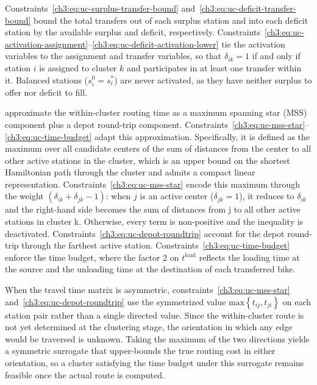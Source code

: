 Constraints~\eqref{ch3:eq:uc-surplus-transfer-bound} and~\eqref{ch3:eq:uc-deficit-transfer-bound} bound the total transfers out of each surplus station and into each deficit station by the available surplus and deficit, respectively. Constraints~\eqref{ch3:eq:uc-activation-assignment}--\eqref{ch3:eq:uc-deficit-activation-lower} tie the activation variables to the assignment and transfer variables, so that ${{\delta }_{ik}}=1$ if and only if station $i$ is assigned to cluster $k$ and participates in at least one transfer within it. Balanced stations ($s_{i}^{0}=s_{i}^{*}$) are never activated, as they have neither surplus to offer nor deficit to fill.

\citet{schuijbroekInventoryRebalancingVehicle2017} approximate the within-cluster routing time as a maximum spanning star (MSS) component plus a depot round-trip component. Constraints~\eqref{ch3:eq:uc-mss-star}--\eqref{ch3:eq:uc-time-budget} adapt this approximation. Specifically, it is defined as the maximum over all candidate centers of the sum of distances from the center to all other active stations in the cluster, which is an upper bound on the shortest Hamiltonian path through the cluster and admits a compact linear representation. Constraints~\eqref{ch3:eq:uc-mss-star} encode this maximum through the weight $\left( {{\delta }_{ik}}+{{\delta }_{jk}}-1 \right)$: when $j$ is an active center (${{\delta }_{jk}}=1$), it reduces to ${{\delta }_{ik}}$ and the right-hand side becomes the sum of distances from j to all other active stations in cluster k. Otherwise, every term is non-positive and the inequality is deactivated. Constraints~\eqref{ch3:eq:uc-depot-roundtrip} account for the depot round-trip through the farthest active station. Constraints~\eqref{ch3:eq:uc-time-budget} enforce the time budget, where the factor 2 on ${{t}^{\text{load}}}$ reflects the loading time at the source and the unloading time at the destination of each transferred bike.

When the travel time matrix is asymmetric, constraints~\eqref{ch3:eq:uc-mss-star} and~\eqref{ch3:eq:uc-depot-roundtrip} use the symmetrized value $\text{max}\left\{ {{t}_{ij}},{{t}_{ji}} \right\}$ on each station pair rather than a single directed value. Since the within-cluster route is not yet determined at the clustering stage, the orientation in which any edge would be traversed is unknown. Taking the maximum of the two directions yields a symmetric surrogate that upper-bounds the true routing cost in either orientation, so a cluster satisfying the time budget under this surrogate remains feasible once the actual route is computed.

